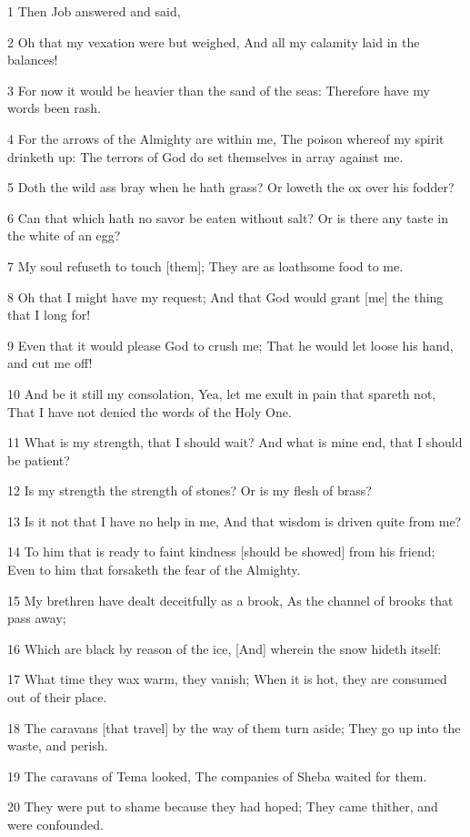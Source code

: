 \par 1 Then Job answered and said,
\par 2 Oh that my vexation were but weighed, And all my calamity laid in the balances!
\par 3 For now it would be heavier than the sand of the seas: Therefore have my words been rash.
\par 4 For the arrows of the Almighty are within me, The poison whereof my spirit drinketh up: The terrors of God do set themselves in array against me.
\par 5 Doth the wild ass bray when he hath grass? Or loweth the ox over his fodder?
\par 6 Can that which hath no savor be eaten without salt? Or is there any taste in the white of an egg?
\par 7 My soul refuseth to touch [them]; They are as loathsome food to me.
\par 8 Oh that I might have my request; And that God would grant [me] the thing that I long for!
\par 9 Even that it would please God to crush me; That he would let loose his hand, and cut me off!
\par 10 And be it still my consolation, Yea, let me exult in pain that spareth not, That I have not denied the words of the Holy One.
\par 11 What is my strength, that I should wait? And what is mine end, that I should be patient?
\par 12 Is my strength the strength of stones? Or is my flesh of brass?
\par 13 Is it not that I have no help in me, And that wisdom is driven quite from me?
\par 14 To him that is ready to faint kindness [should be showed] from his friend; Even to him that forsaketh the fear of the Almighty.
\par 15 My brethren have dealt deceitfully as a brook, As the channel of brooks that pass away;
\par 16 Which are black by reason of the ice, [And] wherein the snow hideth itself:
\par 17 What time they wax warm, they vanish; When it is hot, they are consumed out of their place.
\par 18 The caravans [that travel] by the way of them turn aside; They go up into the waste, and perish.
\par 19 The caravans of Tema looked, The companies of Sheba waited for them.
\par 20 They were put to shame because they had hoped; They came thither, and were confounded.
